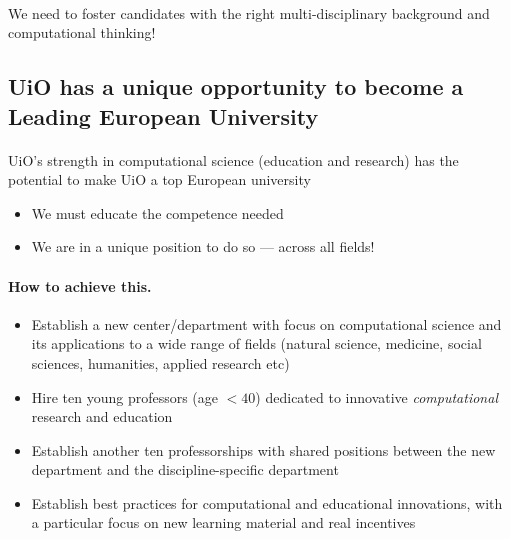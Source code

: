 \documentclass[%
twoside,                 %
final,                   %
10pt]{article}
\begin{document}
\noindent




\paragraph{}
We need to foster candidates with the right
multi-disciplinary background and computational thinking!








\subsection{UiO has a unique opportunity to become a Leading European University}


\paragraph{}
UiO's strength in computational science (education and research)
has the potential to make UiO a top European university

\begin{itemize}
\item We must educate the competence needed

\item We are in a unique position to do so --- across all fields!
\end{itemize}

\noindent




\paragraph{How to achieve this.}
\begin{itemize}
\item Establish  a new center/department with focus on computational science and its applications to a wide range of fields (natural science, medicine, social sciences, humanities, applied research etc)

\item Hire ten young professors (age $< 40$) dedicated to innovative \emph{computational} research and education

\item Establish another ten professorships with  shared positions between the  new department and the discipline-specific department

\item Establish  best practices for computational and educational innovations, with a particular focus on  new learning material and real incentives
\end{itemize}
\end{document}
